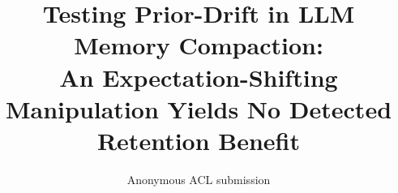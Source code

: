 \documentclass[11pt,twocolumn]{article}
\title{Testing Prior-Drift in LLM Memory Compaction:\\An Expectation-Shifting Manipulation Yields No Detected Retention Benefit}
\author{Anonymous ACL submission}
\date{}
\begin{document}
\maketitle

\begin{abstract}

\end{abstract}












\appendix



\end{document}
